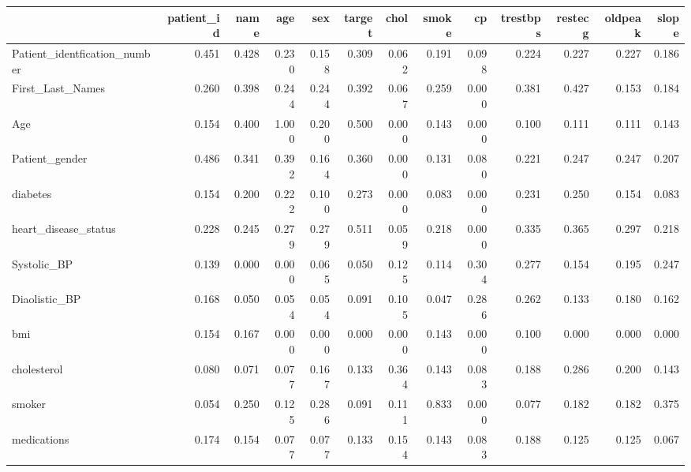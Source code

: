 \begin{tabular}{lrrrrrrrrrrrr}
\toprule
 & patient_id & name & age & sex & target & chol & smoke & cp & trestbps & restecg & oldpeak & slope \\
\midrule
Patient_identfication_number & 0.451 & 0.428 & 0.230 & 0.158 & 0.309 & 0.062 & 0.191 & 0.098 & 0.224 & 0.227 & 0.227 & 0.186 \\
First_Last_Names & 0.260 & 0.398 & 0.244 & 0.244 & 0.392 & 0.067 & 0.259 & 0.000 & 0.381 & 0.427 & 0.153 & 0.184 \\
Age & 0.154 & 0.400 & 1.000 & 0.200 & 0.500 & 0.000 & 0.143 & 0.000 & 0.100 & 0.111 & 0.111 & 0.143 \\
Patient_gender & 0.486 & 0.341 & 0.392 & 0.164 & 0.360 & 0.000 & 0.131 & 0.080 & 0.221 & 0.247 & 0.247 & 0.207 \\
diabetes & 0.154 & 0.200 & 0.222 & 0.100 & 0.273 & 0.000 & 0.083 & 0.000 & 0.231 & 0.250 & 0.154 & 0.083 \\
heart_disease_status & 0.228 & 0.245 & 0.279 & 0.279 & 0.511 & 0.059 & 0.218 & 0.000 & 0.335 & 0.365 & 0.297 & 0.218 \\
Systolic_BP & 0.139 & 0.000 & 0.000 & 0.065 & 0.050 & 0.125 & 0.114 & 0.304 & 0.277 & 0.154 & 0.195 & 0.247 \\
Diaolistic_BP & 0.168 & 0.050 & 0.054 & 0.054 & 0.091 & 0.105 & 0.047 & 0.286 & 0.262 & 0.133 & 0.180 & 0.162 \\
bmi & 0.154 & 0.167 & 0.000 & 0.000 & 0.000 & 0.000 & 0.143 & 0.000 & 0.100 & 0.000 & 0.000 & 0.000 \\
cholesterol & 0.080 & 0.071 & 0.077 & 0.167 & 0.133 & 0.364 & 0.143 & 0.083 & 0.188 & 0.286 & 0.200 & 0.143 \\
smoker & 0.054 & 0.250 & 0.125 & 0.286 & 0.091 & 0.111 & 0.833 & 0.000 & 0.077 & 0.182 & 0.182 & 0.375 \\
medications & 0.174 & 0.154 & 0.077 & 0.077 & 0.133 & 0.154 & 0.143 & 0.083 & 0.188 & 0.125 & 0.125 & 0.067 \\
\bottomrule
\end{tabular}
